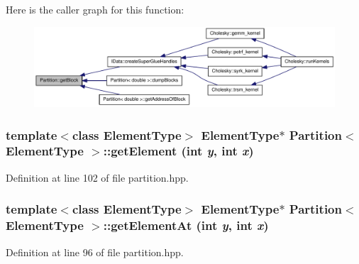 Here is the caller graph for this function:\nopagebreak
\begin{figure}[H]
\begin{center}
\leavevmode
\includegraphics[width=336pt]{class_partition_ac675bc154e0d7fb01bf9db46196165ba_icgraph}
\end{center}
\end{figure}
\hypertarget{class_partition_a541241fa1ca1de2c82a43612e9774f00}{
\subsubsection[{getElement}]{\setlength{\rightskip}{0pt plus 5cm}template$<$class ElementType$>$ ElementType$\ast$ {\bf Partition}$<$ ElementType $>$::getElement (int {\em y}, \/  int {\em x})}}
\label{class_partition_a541241fa1ca1de2c82a43612e9774f00}


Definition at line 102 of file partition.hpp.\hypertarget{class_partition_aad83ba7499b811fd266fdfd97d38204c}{
\subsubsection[{getElementAt}]{\setlength{\rightskip}{0pt plus 5cm}template$<$class ElementType$>$ ElementType$\ast$ {\bf Partition}$<$ ElementType $>$::getElementAt (int {\em y}, \/  int {\em x})}}
\label{class_partition_aad83ba7499b811fd266fdfd97d38204c}


Definition at line 96 of file partition.hpp.

